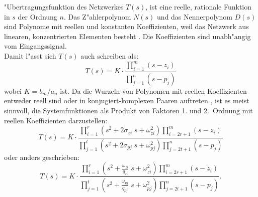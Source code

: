 "Ubertragungsfunktion des Netzwerkes $T(s)$, ist eine reelle,
rationale Funktion in $s$ der
Ordnung $n$.  Das Z"ahlerpolynom $N(s)$ und das
Nennerpolynom $D(s)$ sind Polynome mit reellen
und konstanten Koeffizienten, weil das Netzwerk aus linearen,
konzentrierten Elementen besteht \cite{MOS:89}. Die
Koeffizienten sind unabh"angig vom Eingangssignal.\\
{\bf{}}  Damit l"asst
sich $T(s)$ auch schreiben als:
\begin{equation*}
T(s)=K \cdot\frac{{\displaystyle \prod_{i=1}^{m}} (s - z_{i})}
{{\displaystyle \prod_{j=1}^{n}} (s - p_{j})}
\end{equation*}
wobei $K=b_{m}/a_{n}$ ist. {\bf{}}  Da
die Wurzeln von Polynomen mit reellen Koeffizienten
entweder reell sind oder in konjugiert-komplexen Paaren auftreten \cite{MOS:89}, ist
es meist sinnvoll, die Systemfunktionen als Produkt von Faktoren 1.
und 2.~Ordnung mit reellen Koeffizienten darzustellen:
\begin{equation*}
T(s)=K \cdot\frac{{\displaystyle\prod_{i=1}^{r}} (s^{2} + 2\sigma_{zi}\; s + 
\omega_{zi}^{2})
{\displaystyle\prod_{i=2r+1}^{m}}(s - z_{i})} 
{{\displaystyle\prod_{j=1}^{t}} (s^{2} + 2\sigma_{pj}\; s + \omega_{pj}^{2})
{\displaystyle\prod_{j=2t+1}^{n}}(s - p_{j})}
\end{equation*}  
oder anders geschrieben:
\begin{equation*}
T(s)=K \cdot\frac{{\displaystyle\prod_{i=1}^{r}} (s^{2} + 
\displaystyle\frac{\omega_{zi}}
{q_{zi}}\; s + \omega_{zi}^{2}) {\displaystyle\prod_{i=2r+1}^{m}}(s - z_{i})} 
{{\displaystyle\prod_{j=1}^{t}} (s^{2} + 
\displaystyle\frac{\omega_{pj}}{q_{pj}}\; s + 
\omega_{pj}^{2}) {\displaystyle\prod_{j=2t+1}^{n}}(s - p_{j})}.
\end{equation*}


